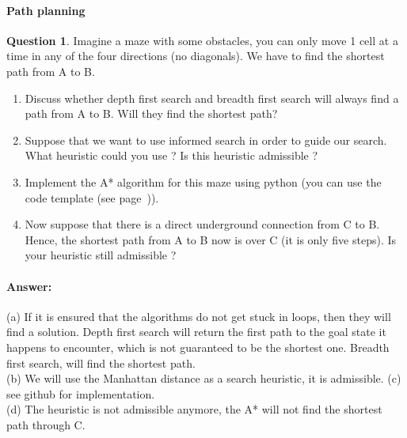 \documentclass[11pt,a4paper]{article}
\theoremstyle{definition}%
\newtheorem{Q}{Question}[] %
\newcommand{\reponse}[1]{%
\ifthenelse {\boolean{corrige}} {\paragraph{Answer:} \color{darkblue}   #1\color{black}} {}
}
\begin{document}
\paragraph{Path planning}
\begin{Q}
    Imagine a maze with some obstacles, you can only move 1 cell at a time in any of 
    the four directions (no diagonals). We have to find the shortest path from A to B.

    \begin{center}
\end{center}

\begin{enumerate}
    \item Discuss whether depth first search and breadth first search will always find a path from
    A to B. Will they find the shortest path?
    \item Suppose that we want to use informed search in order to guide our search. 
        What heuristic could you use ? Is this heuristic admissible ?
    \item Implement the A* algorithm for this maze using python (you can use the code template (see page~\pageref{source})).
    \item Now suppose that there is a direct underground connection from C to B. Hence, the
    shortest path from A to B now is over C (it is only five steps). Is your heuristic still admissible ?
\end{enumerate}


\reponse{
    (a) If it is ensured that the algorithms do not get stuck in loops, then they will find a
solution. Depth first search will return the first path to the goal state it happens to
encounter, which is not guaranteed to be the shortest one. Breadth first search, will
find the shortest path.\\
(b) We will use the Manhattan distance as a search heuristic, it is admissible.
(c) see github for implementation.\\
(d) The heuristic is not admissible anymore, the A* will not find the shortest path through C.

}
\end{Q}
\end{document}
